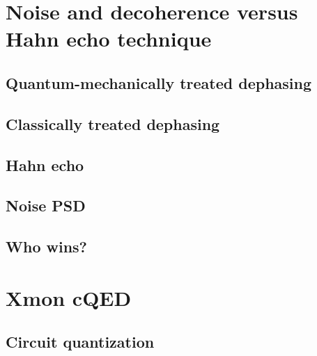\documentclass[aspectratio=169, 13pt]{beamer}
\begin{document}
\section{Noise and decoherence versus Hahn echo technique}
\subsection{Quantum-mechanically treated dephasing}
\frame{\frametitle{\secname}\framesubtitle{\subsecname}

}
\subsection{Classically treated dephasing}
\frame{\frametitle{\secname}\framesubtitle{\subsecname}

}


\subsection{Hahn echo}
\begin{frame}[c]\frametitle{\secname}\framesubtitle{\subsecname}

\end{frame}

\subsection{Noise PSD}
\begin{frame}[c]\frametitle{\secname}\framesubtitle{\subsecname}

\end{frame}

\subsection{Who wins?}
\begin{frame}[c]\frametitle{\secname}\framesubtitle{\subsecname}

\end{frame}

\section{Xmon cQED}


\subsection{Circuit quantization}
\frame{\frametitle{\secname}\framesubtitle{\subsecname}

}
\end{document}
